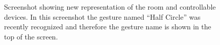 \begin{figure}[!htb]%
    \centering
    \caption{Screenshot showing new representation of the room and controllable devices. In this screenshot the gesture named ``Half Circle'' was recently recognized and therefore the gesture name is shown in the top of the screen.}
    \label{fig:prototype3-room-screenshot}
\end{figure}

